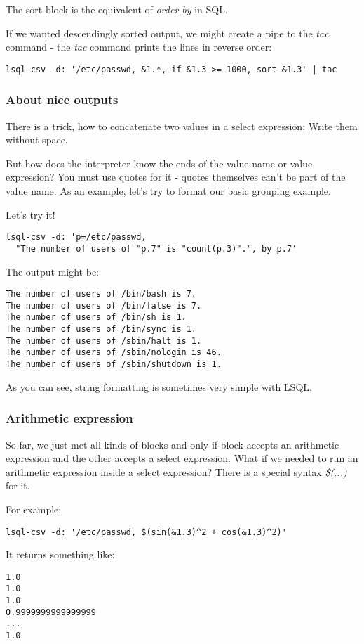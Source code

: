 The sort block is the equivalent of \textit{order by} in SQL.

If we wanted descendingly sorted output, we might create a pipe to the \textit{tac} command - the \textit{tac} command prints the lines in reverse order:
\begin{verbatim}
lsql-csv -d: '/etc/passwd, &1.*, if &1.3 >= 1000, sort &1.3' | tac
\end{verbatim}

\subsubsection{About nice outputs}
There is a trick, how to concatenate two values in a select expression: Write them without space.

But how does the interpreter know the ends of the value name or value expression? You must use quotes for it - quotes themselves can't be part of the value name.
As an example, let's try to format our basic grouping example.

Let's try it!
\begin{verbatim}
lsql-csv -d: 'p=/etc/passwd, 
  "The number of users of "p.7" is "count(p.3)".", by p.7'
\end{verbatim}
The output might be:
\begin{verbatim}
The number of users of /bin/bash is 7.
The number of users of /bin/false is 7.
The number of users of /bin/sh is 1.
The number of users of /bin/sync is 1.
The number of users of /sbin/halt is 1.
The number of users of /sbin/nologin is 46.
The number of users of /sbin/shutdown is 1.
\end{verbatim}

As you can see, string formatting is sometimes very simple with LSQL.

\subsubsection{Arithmetic expression}
So far, we just met all kinds of blocks and only if block accepts an arithmetic expression and the other accepts a select expression.
What if we needed to run an arithmetic expression inside a select expression? There is a special syntax \textit{\$(...)} for it.

For example:
\begin{verbatim}
lsql-csv -d: '/etc/passwd, $(sin(&1.3)^2 + cos(&1.3)^2)'
\end{verbatim}

It returns something like:
\begin{verbatim}
1.0
1.0
1.0
0.9999999999999999
...
1.0
\end{verbatim}

